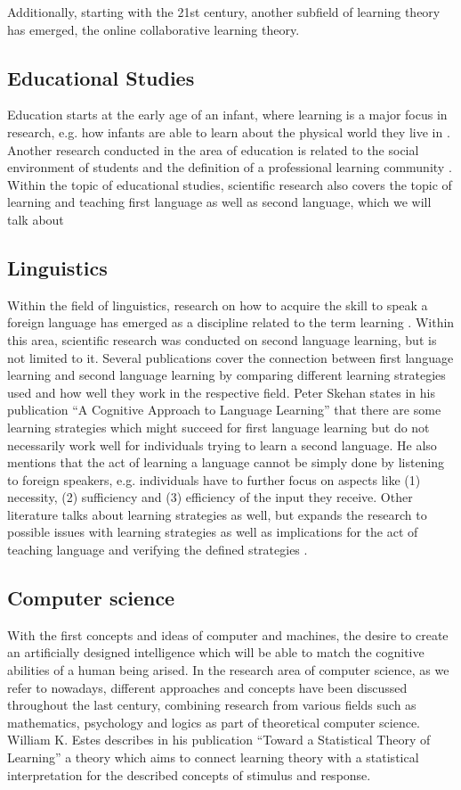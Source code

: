 \documentclass[conference]{IEEEtran}
\begin{document}
		Additionally, starting with the 21st century, another subfield of learning theory has emerged, the online collaborative learning theory.

	\subsection{Educational Studies}\label{ES}
		Education starts at the early age of an infant, where learning is a major focus in research, e.g. how infants are able to learn about the physical world they live in \cite{d2}. Another research conducted in the area of education is related to the social environment of students and the definition of a professional learning community \cite{d3}. Within the topic of educational studies, scientific research also covers the topic of learning and teaching first language as well as second language, which we will talk about

	\subsection{Linguistics}\label{Li}
		Within the field of linguistics, research on how to acquire the skill to speak a foreign language has emerged as a discipline related to the term learning \cite{d4}. Within this area, scientific research was conducted on second language learning, but is not limited to it. Several publications cover the connection between first language learning and second language learning by comparing different learning strategies used and how well they work in the respective field. Peter Skehan states in his publication ``A Cognitive Approach to Language Learning'' \cite{d5} that there are some learning strategies which might succeed for first language learning but do not necessarily work well for individuals trying to learn a second language. He also mentions that the act of learning a language cannot be simply done by listening to foreign speakers, e.g. individuals have to further focus on aspects like (1) necessity, (2) sufficiency and (3) efficiency of the input they receive. Other literature talks about learning strategies as well, but expands the research to possible issues with learning strategies as well as implications for the act of teaching language and verifying the defined strategies \cite{d6}.

	\subsection{Computer science}\label{CS}
		With the first concepts and ideas of computer and machines, the desire to create an artificially designed intelligence which will be able to match the cognitive abilities of a human being arised. In the research area of computer science, as we refer to nowadays, different approaches and concepts have been discussed throughout the last century, combining research from various fields such as mathematics, psychology and logics as part of theoretical computer science. William K. Estes describes in his publication “Toward a Statistical Theory of Learning” \cite{d7} a theory which aims to connect learning theory with a statistical interpretation for the described concepts of stimulus and response.
\end{document}
